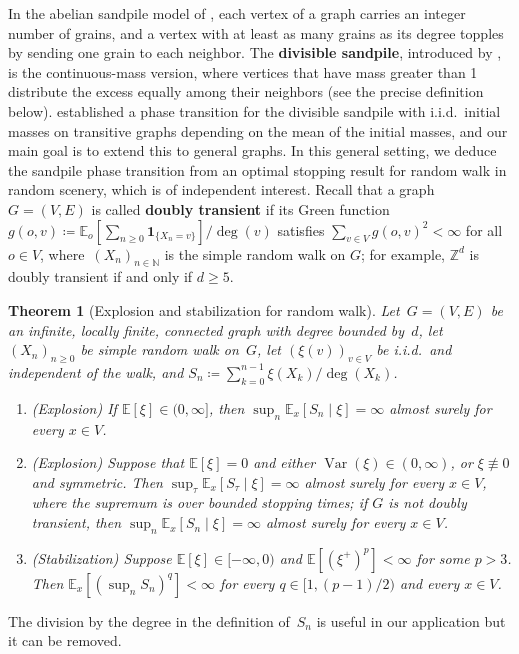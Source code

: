 \documentclass[aop]{imsart}
\theoremstyle{plain}
\newtheorem{theorem}{Theorem}[section]
\theoremstyle{definition}
\newcommand{\Z}{\mathbb{Z}}
\newcommand{\N}{\mathbb{N}}
\newcommand{\E}{\mathbb{E}}
\newcommand{\one}{\mathbf{1}}
\DeclareMathOperator{\var}{Var}
\begin{document}
	In the abelian sandpile model of \citet*{BTW}, each vertex of a graph carries an integer number of grains, and a vertex with at least as many grains as its degree topples by sending one grain to each neighbor. The \textbf{divisible sandpile}, introduced by \citet{LP09, LP10}, is the continuous-mass version, where vertices that have mass greater than 1 distribute the excess equally among their neighbors (see the precise definition below). \citet*{div-sand-crit} established a phase transition for  the divisible sandpile with i.i.d.\ initial masses on transitive graphs depending on the mean of the initial masses, and our main goal is to extend this to general graphs. 
	In this general setting, we deduce the sandpile phase transition from an optimal stopping result for random walk in random scenery, which is of independent interest. Recall that a graph~$G = (V,E)$ is called \textbf{doubly transient} if its Green function $g(o,v) \coloneqq \E_o[\sum_{n \geq 0} \one_{\{X_n = v\}}] / \deg(v)$ satisfies $\sum_{v \in V}  g(o,v)^2 < \infty$ for all~$o \in V$, where~$(X_n)_{n\in\N}$ is the simple random walk on $G$; for example, $\Z^d$ is doubly transient if and only if $d \geq 5$.
	\begin{theorem}[Explosion and stabilization for random walk]\label{thm:OS}
		Let~$G=(V,E)$ be an infinite, locally finite, connected graph with degree bounded by~$d$, let~$(X_n)_{n\geq 0}$ be simple random walk on~$G$, let $(\xi(v))_{v\in V}$ be i.i.d.\ and independent of the walk, and $S_n\coloneqq\sum_{k=0}^{n-1}\xi(X_k)/\deg(X_k)$.
		\begin{enumerate}[label=\textup{(\roman*)}]
			\item \textup{(Explosion)}\; If $\E[\xi]\in(0,\infty]$, then $\sup_n\E_x[S_n\mid\xi]=\infty$ almost surely for every $x\in V$.
			\item \textup{(Explosion)}\; Suppose that $\E[\xi]=0$ and either $\var(\xi)\in(0,\infty)$, or $\xi\not\equiv 0$ and symmetric.   Then $\sup_{\tau} \E_x[S_\tau \mid\xi]=\infty$ almost surely for every $x\in V$, where the supremum is over bounded stopping times; if $G$ is not doubly transient, then $\sup_n\E_x[S_n\mid\xi]=\infty$ almost surely for every $x\in V$.
			\item \textup{(Stabilization)}\; Suppose $\E[\xi]\in[-\infty,0)$ and $\E[(\xi^+)^p]<\infty$ for some $p>3$. Then $\E_x[(\sup_n S_n)^q]<\infty$ for every $q\in[1,(p-1)/2)$ and every $x\in V$.
		\end{enumerate}
	\end{theorem}
	The division by the degree in the definition of~$S_n$ is useful in our application but it can be removed.  
\end{document}
